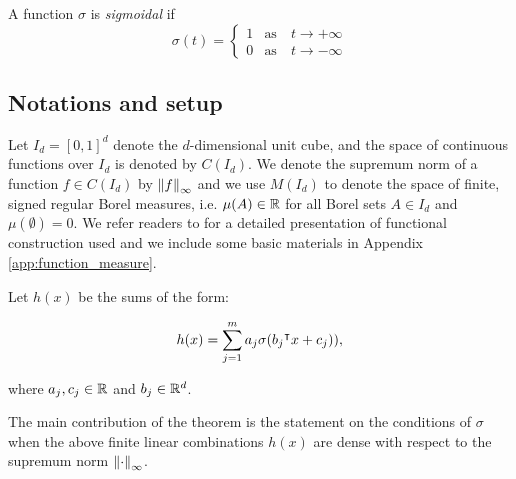 

\begin{definition}\label{def:sigmoidal}
    A function $\sigma$ is \textit{sigmoidal} if
    \begin{equation}
        \sigma(t) =
        \begin{cases}
            1 & \text{as} \quad t \to +\infty \\
            0 & \text{as} \quad t \to -\infty
        \end{cases}
    \end{equation}
\end{definition}

\subsection*{Notations and setup}

Let $I_d = [0,1]^d$ denote the $d$-dimensional unit cube, and the space of
continuous functions over $I_d$ is denoted by $C(I_d)$. We denote the supremum
norm of a function $f \in C(I_d)$ by $\left\| f \right\|_{\infty}$ and we use $M(I_d)$ to
denote the space of finite, signed regular Borel measures, i.e. $\mu(A) \in \mathbb{R}$
for all Borel sets $A \in I_d$ and $\mu(\emptyset)= 0$. We refer readers to
\cite{rudinFunctionalAnalysis1991, rudinRealComplexAnalysis1987} for a detailed
presentation of functional construction used and we include some basic materials
in Appendix \ref{app:function_measure}.

Let $h(x)$ be the sums of the form:

\begin{equation*}\label{eq:sum_sigma}
    h(x) = \sum_{j=1}^m a_j \sigma(b_j{}^{\intercal} x + c_j)),
\end{equation*}

where $a_j, c_j \in \mathbb{R}$ and $b_j \in \mathbb{R}^d$.
 
The main contribution of the theorem is the statement on the conditions of
$\sigma$ when the above finite linear combinations $h(x)$ are dense with respect
to the supremum norm $\left\| \cdot \right\|_{\infty}$.

